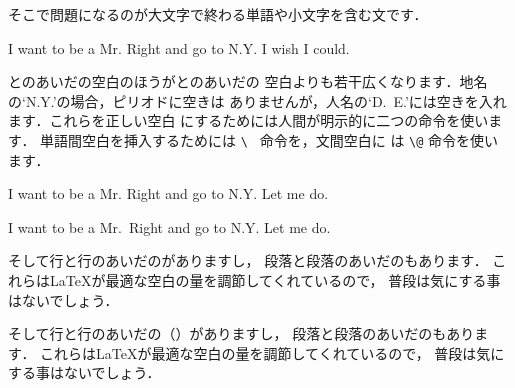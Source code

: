 {そこで問題になるのが大文字で終わる単語や小文字を含む文です．
\begin{InOut}
I want to be a Mr. Right and go to
 N.Y. I wish I could.
\end{InOut}
とのあいだの空白のほうがとのあいだの
空白よりも若干広くなります．地名の`N.Y.'の場合，ピリオドに空きは
ありませんが，人名の`D.~E.'には空きを入れます．これらを正しい空白
にするためには人間が明示的に二つの命令を使います．
単語間空白を挿入するためには \verb*|\ | 命令を，文間空白に
は \verb|\@| 命令を使います．%
\begin{InOut}
I want to be a Mr. Right and go 
to N.Y. Let me do.\par
I want to be a Mr.\ Right and go 
to N.Y\@. Let me do.
\end{InOut}
そして行と行のあいだのがありますし，
段落と段落のあいだのもあります．
これらは{\LaTeX}が最適な空白の量を調節してくれているので，
普段は気にする事はないでしょう．

%
そして行と行のあいだの（）がありますし，
段落と段落のあいだのもあります．
これらは{\LaTeX}が最適な空白の量を調節してくれているので，
普段は気にする事はないでしょう．

}
